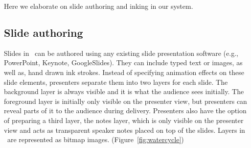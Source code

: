 Here we elaborate on slide authoring and inking in our system.



\subsection{Slide authoring}
Slides in \interface\ can be authored using any existing slide presentation software (e.g., PowerPoint, Keynote, GoogleSlides). They can include typed text or images, as well as, hand drawn ink strokes. Instead of specifying animation effects on these slide elements, presenters separate them into two layers for each slide. The background layer is always visible and it is what the audience sees initially. The foreground layer is initially only visible on the presenter view, but presenters can reveal parts of it to the audience during delivery. Presenters also have the option of preparing a third layer, the notes layer, which is only visible on the presenter view and acts as transparent speaker notes placed on top of the slides. Layers in \interface\ are represented as bitmap images. (Figure~\ref{fig:watercycle})

